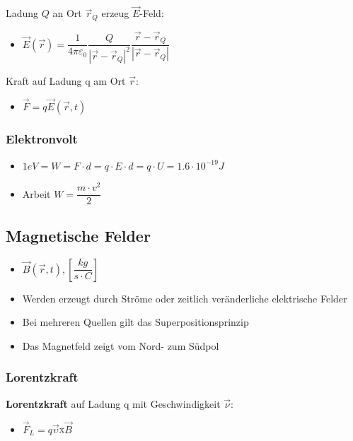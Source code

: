 \documentclass[8pt,a4paper]{scrartcl}
\begin{document}
\begin{multicols*}{3}
				Ladung $Q$ an Ort $\overrightarrow{r}_{Q}$ erzeug $\overrightarrow{E}$-Feld:		
				\begin{itemize}\itemsep0pt
					\item $\overrightarrow{E}(\overrightarrow{r}) = \dfrac{1}{4\pi\varepsilon_{0}} \dfrac{Q}{|\overrightarrow{r}-\overrightarrow{r}_{Q}|^{2}}  \dfrac{\overrightarrow{r}-\overrightarrow{r}_{Q}}{|\overrightarrow{r}-\overrightarrow{r}_{Q}|}$
					
				\end{itemize}
				Kraft auf Ladung q am Ort 
				$\overrightarrow{r}$:
				\begin{itemize}\itemsep0pt
					\item $\overrightarrow{F}=q\overrightarrow{E}(\overrightarrow{r},t)$
				\end{itemize}
			\subsubsection{Elektronvolt}
				\begin{itemize}\itemsep0pt
					\item $1 eV = W = F \cdot d =q\cdot E\cdot d=q \cdot U= 1.6\cdot10^{-19}J$
					\item Arbeit $W=\dfrac{m\cdot v^{2}}{2}$
				\end{itemize}
			\subsection{Magnetische Felder}
				\begin{itemize}\itemsep0pt
					\item $\overrightarrow{B}(\overrightarrow{r},t), [\dfrac{kg}{s\cdot C}]$
					\item Werden erzeugt durch Ströme oder zeitlich veränderliche elektrische Felder
					\item Bei mehreren Quellen gilt das Superpositionsprinzip
					\item Das Magnetfeld zeigt vom Nord- zum Südpol
				\end{itemize}
				
				\subsubsection{Lorentzkraft}				
				
					\textbf{Lorentzkraft} auf Ladung q mit Geschwindigkeit $\overrightarrow{\nu}$:
					\begin{itemize}\itemsep0pt
						\item $\overrightarrow{F}_{L}=q\overrightarrow{\upsilon} $x$ \overrightarrow{B}$
					\end{itemize}	
					

\end{multicols*}
\end{document}
